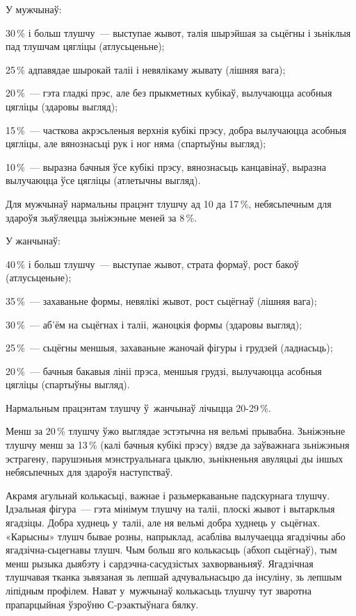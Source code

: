 У мужчынаў:

30\,\% і больш тлушчу~--- выступае жывот, талія шырэйшая за сьцёгны і зьніклыя пад тлушчам цягліцы (атлусьценьне);

25\,\% адпавядае шырокай таліі і невялікаму жывату (лішняя вага);

20\,\%~--- гэта гладкі прэс, але без прыкметных кубікаў, вылучаюцца асобныя цягліцы (здаровы выгляд);

15\,\%~--- часткова акрэсьленыя верхнія кубікі прэсу, добра вылучаюцца асобныя цягліцы, але вянознасьці рук і ног няма (спартыўны выгляд);

10\,\%~--- выразна бачныя ўсе кубікі прэсу, вянознасьць канцавінаў, выразна вылучаюцца ўсе цягліцы (атлетычны выгляд).

Для мужчынаў нармальны працэнт тлушчу ад 10 да 17\,\%, небясьпечным для здароўя зьяўляецца зьніжэньне меней за 8\,\%.

У жанчынаў:

40\,\% і больш тлушчу~--- выступае жывот, страта формаў, рост бакоў (атлусьценьне);

35\,\%~--- захаваньне формы, невялікі жывот, рост сьцёгнаў (лішняя вага);

30\,\%~--- аб'ём на сьцёгнах і таліі, жаноцкія формы (здаровы выгляд);

25\,\%~--- сьцёгны меншыя, захаваньне жаночай фігуры і грудзей (ладнасьць);

20\,\%~--- бачныя бакавыя лініі прэса, меншыя грудзі, вылучаюцца асобныя цягліцы (спартыўны выгляд).

Нармальным працэнтам тлушчу ў~жанчынаў лічыцца 20-29\,\%.

Менш за 20\,\% тлушчу ўжо выглядае эстэтычна ня вельмі прывабна. Зьніжэньне тлушчу менш за 13\,\% (калі бачныя кубікі прэсу) вядзе да заўважнага зьніжэньня эстрагену, парушэньня мэнструальнага цыклю, зьнікненьня авуляцыі ды іншых небясьпечных для здароўя наступстваў.

Акрамя агульнай колькасьці, важнае і разьмеркаваньне падскурнага тлушчу. Ідэальная фігура~--- гэта мінімум тлушчу на таліі, плоскі жывот і вытарклыя ягадзіцы. Добра худнець у~таліі, але ня вельмі добра худнець у~сьцёгнах. «Карысны» тлушч бывае розны, напрыклад, асабліва вылучаецца ягадзічны або ягадзічна-сьцегнавы тлушч. Чым больш яго колькасьць (абхоп сьцёгнаў), тым менш рызыка дыябэту і сардэчна-сасудзістых захворваньняў. Ягадзічная тлушчавая тканка зьвязаная зь лепшай адчувальнасьцю да інсуліну, зь лепшым ліпідным профілем. Нават у~мужчынаў колькасьць тлушчу тут зваротна прапарцыйная ўзроўню С-рэактыўнага бялку.

